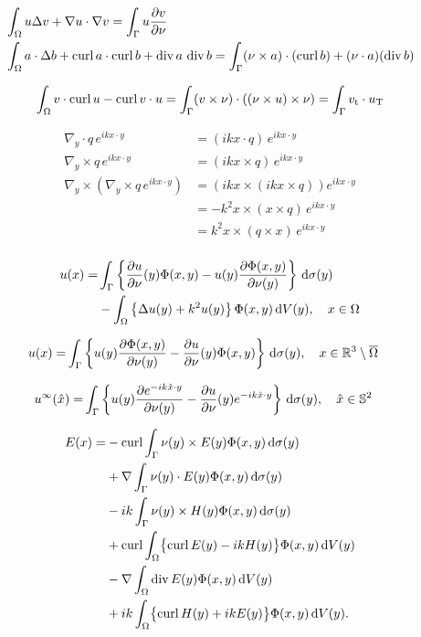 \begin{align*}
  &\int_{\Omega}u\Delta v+\nabla u\cdot\nabla v=\int_{\Gamma}u\frac{\partial v}{\partial\nu} \\
  &\int_{\Omega}a\cdot\Delta b+\operatorname{curl} a\cdot\operatorname{curl} b + \operatorname{div} a\,\operatorname{div} b=\int_{\Gamma}(\nu\times a)\cdot(\operatorname{curl} b)+(\nu\cdot a)(\operatorname{div} b)
\end{align*}

\begin{align*}
  \int_{\Omega}v\cdot\operatorname{curl} u - \operatorname{curl} v\cdot u=\int_{\Gamma}(v\times\nu)\cdot((\nu\times u)\times\nu) = \int_{\Gamma}v_{\text t}\cdot u_{\text T}
\end{align*}

\begin{align*}
  \nabla_y\cdot q\,e^{ikx\cdot y} &= (ikx\cdot q)\,e^{ikx\cdot y} \\
  \nabla_y\times q\,e^{ikx\cdot y} &= (ikx\times q)\,e^{ikx\cdot y} \\
  \nabla_y\times(\nabla_y\times q\,e^{ikx\cdot y}) &= \left(ikx\times\left(ikx\times q\right)\right)e^{ikx\cdot y} \\
  &= -k^2 x\times(x\times q)\,e^{ikx\cdot y} \\ 
  &= k^2 x\times(q\times x)\,e^{ikx\cdot y} \\
\end{align*}

\begin{align*}
  u(x)= &\int_{\Gamma}\left\{\frac{\partial u}{\partial\nu}(y)\Phi(x,y)-u(y)\frac{\partial\Phi(x,y)}{\partial\nu(y)}\right\}\,\text{d}\sigma(y)\\
        &-\int_{\Omega}\left\{\Delta u(y)+k^2 u(y)\right\}\Phi(x,y)\,\text{d}V(y),\quad x\in\Omega
\end{align*}

\begin{align*}
  u(x)= &\int_{\Gamma}\left\{u(y)\frac{\partial\Phi(x,y)}{\partial\nu(y)}-\frac{\partial u}{\partial\nu}(y)\Phi(x,y)\right\}\,\text{d}\sigma(y),\quad x\in\mathbb{R}^3\setminus\overline{\Omega}
\end{align*}

\begin{align*}
  u^\infty(\hat{x})= &\int_{\Gamma}\left\{u(y)\frac{\partial e^{-ik\hat{x}\cdot y}}{\partial\nu(y)}-\frac{\partial u}{\partial\nu}(y)e^{-ik\hat{x}\cdot y}\right\}\,\text{d}\sigma(y),\quad\hat{x}\in\mathbb{S}^2
\end{align*}

\begin{align*}
  E(x)= &-\operatorname{curl}\int_{\Gamma}\nu(y)\times E(y)\Phi(x,y)\,\text{d}\sigma(y)\\
        &+\nabla\int_{\Gamma}\nu(y)\cdot E(y)\Phi(x,y)\,\text{d}\sigma(y)\\
        &-ik\int_{\Gamma}\nu(y)\times H(y)\Phi(x,y)\,\text{d}\sigma(y)\\
        &+\operatorname{curl}\int_{\Omega}\bigl\{\operatorname{curl} E(y)-ikH(y)\bigr\}\Phi(x,y)\,\text{d}V(y)\\
        &-\nabla\int_{\Omega}\operatorname{div} E(y)\Phi(x,y)\,\text{d}V(y)\\
        &+ik\int_{\Omega}\bigl\{\operatorname{curl} H(y)+ikE(y)\bigr\}\Phi(x,y)\,\text{d}V(y).
\end{align*}

